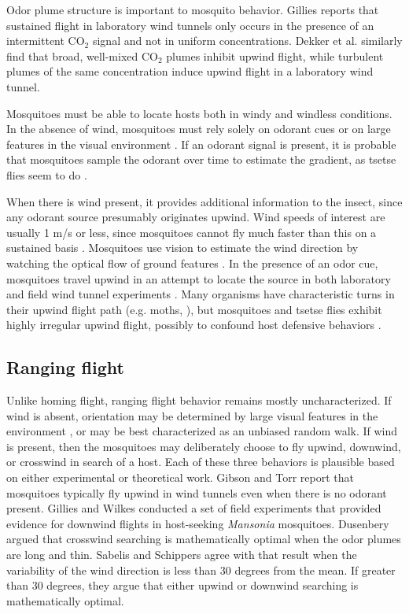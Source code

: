 \documentclass[12pt]{article}
\begin{document}
Odor plume structure is important to mosquito behavior. Gillies \cite{Gillies1980} reports that sustained flight in laboratory wind tunnels only occurs in the presence of an intermittent CO$_2$ signal and not in uniform concentrations. Dekker et al. \cite{Dekker2005,Dekker2001} similarly find that broad, well-mixed CO$_2$ plumes inhibit upwind flight, while turbulent plumes of the same concentration induce upwind flight in a laboratory wind tunnel.

Mosquitoes must be able to locate hosts both in windy and windless conditions. In the absence of wind, mosquitoes must rely solely on odorant cues \cite{Vickers2000} or on large features in the visual environment \cite{Bidlingmayer1994}. If an odorant signal is present, it is probable that mosquitoes sample the odorant over time to estimate the gradient, as tsetse flies seem to do \cite{Carde1996}. 

When there is wind present, it provides additional information to the insect, since any odorant source presumably originates upwind. Wind speeds of interest are usually 1 m/s or less, since mosquitoes cannot fly much faster than this on a sustained basis \cite{Clements1999}. Mosquitoes use vision to estimate the wind direction by watching the optical flow of ground features \cite{Carde1996}. In the presence of an odor cue, mosquitoes travel upwind in an attempt to locate the source in both laboratory and field wind tunnel experiments \cite{Cooperband2006, Dekker2005,Dekker2001}. Many organisms have characteristic turns in their upwind flight path (e.g. moths, \cite{Carde1996,Vickers2000}), but mosquitoes and tsetse flies exhibit highly irregular upwind flight, possibly to confound host defensive behaviors \cite{Davis1996}.

\subsection{Ranging flight}

Unlike homing flight, ranging flight behavior remains mostly uncharacterized. If wind is absent, orientation may be determined by large visual features in the environment \cite{Bidlingmayer1994}, or may be best characterized as an unbiased random walk. If wind is present, then the mosquitoes may deliberately choose to fly upwind, downwind, or crosswind in search of a host. Each of these three behaviors is plausible based on either experimental or theoretical work. Gibson and Torr \cite{Gibson1999} report that mosquitoes typically fly upwind in wind tunnels even when there is no odorant present. Gillies and Wilkes \cite{Gillies1974} conducted a set of field experiments that provided evidence for downwind flights in host-seeking \emph{Mansonia} mosquitoes. Dusenbery \cite{Dusenbery1989} argued that crosswind searching is mathematically optimal when the odor plumes are long and thin. Sabelis and Schippers  \cite{Sabelis1984} agree with that result when the variability of the wind direction is less than 30 degrees from the mean. If greater than 30 degrees, they argue that either upwind or downwind searching is mathematically optimal. 
\end{document}

